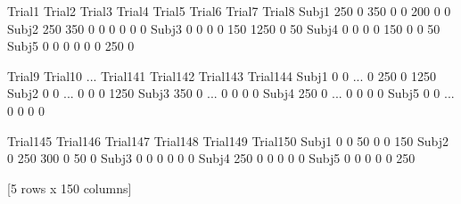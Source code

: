 \documentclass[letterpaper,10pt,english]{jupyterBook}
\begin{document}
\begin{sphinxVerbatim}[commandchars=\\\{\}]
        Trial1  Trial2  Trial3  Trial4  Trial5  Trial6  Trial7  Trial8  \PYGZbs{}
Subj\PYGZus{}1    \PYGZhy{}250       0    \PYGZhy{}350       0       0    \PYGZhy{}200       0       0   
Subj\PYGZus{}2    \PYGZhy{}250    \PYGZhy{}350       0       0       0       0       0       0   
Subj\PYGZus{}3       0       0       0       0    \PYGZhy{}150   \PYGZhy{}1250       0     \PYGZhy{}50   
Subj\PYGZus{}4       0       0       0       0    \PYGZhy{}150       0       0     \PYGZhy{}50   
Subj\PYGZus{}5       0       0       0       0       0       0    \PYGZhy{}250       0   

        Trial9  Trial10  ...  Trial141  Trial142  Trial143  Trial144  \PYGZbs{}
Subj\PYGZus{}1       0        0  ...         0      \PYGZhy{}250         0     \PYGZhy{}1250   
Subj\PYGZus{}2       0        0  ...         0         0         0     \PYGZhy{}1250   
Subj\PYGZus{}3    \PYGZhy{}350        0  ...         0         0         0         0   
Subj\PYGZus{}4    \PYGZhy{}250        0  ...         0         0         0         0   
Subj\PYGZus{}5       0        0  ...         0         0         0         0   

        Trial145  Trial146  Trial147  Trial148  Trial149  Trial150  
Subj\PYGZus{}1         0         0       \PYGZhy{}50         0         0      \PYGZhy{}150  
Subj\PYGZus{}2         0      \PYGZhy{}250      \PYGZhy{}300         0       \PYGZhy{}50         0  
Subj\PYGZus{}3         0         0         0         0         0         0  
Subj\PYGZus{}4      \PYGZhy{}250         0         0         0         0         0  
Subj\PYGZus{}5         0         0         0         0         0      \PYGZhy{}250  

[5 rows x 150 columns]
\end{sphinxVerbatim}

\begin{sphinxVerbatim}[commandchars=\\\{\}]
   
\end{sphinxVerbatim}

\begin{sphinxVerbatim}[commandchars=\\\{\}]
\PYG{p}{[}\PYG{p}{]}  \PYG{p}{[}\PYG{p}{]}
\end{sphinxVerbatim}
\end{document}
